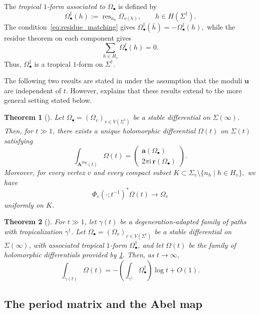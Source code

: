 \documentclass[12pt]{amsart}
\numberwithin{equation}{section}
\newtheorem{theorem}{Theorem}[section]
\theoremstyle{definition}
\def\vertices{V}
\def\res{\operatorname{res}}
\def\trop{\dagger}
\def\imunit{{\mathrm{i}}}
\def\mcurve{\Sigma}
\def\tropmcurve{\mcurve^\trop}
\begin{document}
The \emph{tropical $1$-form associated to $\Omega_\bullet$} is defined by
\[
\Omega_\bullet^\trop(h)
:=
\res_{n_h}\Omega_{v(h)},
\qquad
h\in H(\tropmcurve).
\]
The condition~\eqref{eq:residue_matching} gives
$
\Omega_\bullet^\trop(\bar h)
=
-\Omega_\bullet^\trop(h),
$
while the residue theorem on each component gives
\[
\sum_{h\in H_v}
\Omega_\bullet^\trop(h)
=
0.
\]
Thus, $\Omega_\bullet^\trop$ is a tropical $1$-form on
$\tropmcurve$.


The following two results are stated in \cite{HuNorton} under the
assumption that the moduli $\bm u$ are independent of $t$. However,
\cite[Remark~2.4]{HuNorton} explains that these results extend to the
more general setting stated below.

\begin{theorem}[{\cite[Theorem~1.1]{HuNorton}}]
\label{thm:HuNorton:main1}
Let
$
\Omega_\bullet
=
(\Omega_v)_{v\in\vertices(\tropmcurve)}
$
be a stable differential on $\mcurve(\infty)$. Then, for $t\gg1$, there
exists a unique holomorphic differential
$\Omega(t)$ on $\mcurve(t)$ satisfying
\[
\int_{\bm A^{\mathrm{deg}}(t)}
\Omega(t)
=
\begin{pmatrix}
\bm a(\Omega_\bullet)\\
2\pi\imunit\,\bm r(\Omega_\bullet)
\end{pmatrix}.
\]
Moreover, for every vertex $v$ and every compact subset
$
K
\subset
\mcurve_v
\setminus
\{
n_h\mid h\in H_v
\},
$
we have
\[
\Phi_v(\cdot;t^{-1})^*\Omega(t)\to\Omega_v
\]
uniformly on $K$.
\end{theorem}



\begin{theorem}[{\cite[Theorem~1.2]{HuNorton}}]
\label{thm:tropical_integration}
For $t\gg1$, let $\gamma(t)$ be a degeneration-adapted family of paths
with tropicalization $\gamma^\trop$. Let
$
\Omega_\bullet
=
(\Omega_v)_{v\in\vertices(\tropmcurve)}
$
be a stable differential on $\mcurve(\infty)$, with associated tropical
$1$-form $\Omega_\bullet^\trop$, and let $\Omega(t)$ be the family of
holomorphic differentials provided by
\cref{thm:HuNorton:main1}. Then, as $t\to\infty$,
\[
\int_{\gamma(t)}
\Omega(t)
=
-\left(
\int_{\gamma^\trop}
\Omega_\bullet^\trop
\right)
\log t
+
O(1).
\]
\end{theorem}

\subsection{The period matrix and the Abel map}
\end{document}
